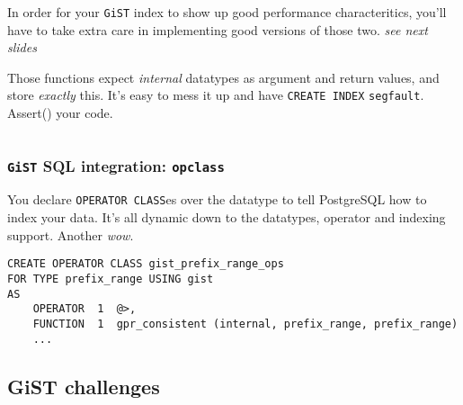 \documentclass{beamer}
\begin{document}
\begin{frame}[fragile]
\begin{columns}[c]
\begin{overprint}
  In order for your \texttt{GiST} index to show up good performance
  characteritics, you'll have to take extra care in implementing good
  versions of those two.
  \linebreak
  \linebreak
  \textit{see next slides}


  Those functions expect \textit{internal} datatypes as argument and return
  values, and store \textit{exactly} this.
  \linebreak
  \linebreak
  It's easy to mess it up and have \texttt{CREATE INDEX}
  \texttt{segfault}. \alert{Assert()} your code.

  \end{overprint}

\end{columns}
\end{frame}

\begin{frame}[fragile]
  \frametitle{\texttt{GiST} SQL integration: \texttt{opclass}}

  You declare \texttt{OPERATOR CLASS}es over the datatype to tell PostgreSQL
  how to index your data. It's all dynamic down to the datatypes, operator
  and indexing support. Another \textit{wow}.

  \pause

  \begin{example}
  \begin{verbatim}
CREATE OPERATOR CLASS gist_prefix_range_ops
FOR TYPE prefix_range USING gist 
AS
    OPERATOR  1  @>,
    FUNCTION  1  gpr_consistent (internal, prefix_range, prefix_range)
    ...
  \end{verbatim}
  \end{example}
\end{frame}


\subsection{GiST challenges}
\end{document}
